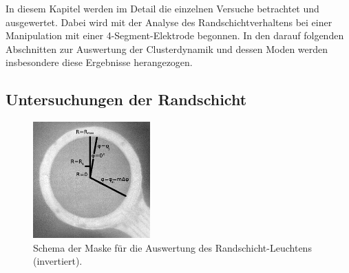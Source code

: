 \documentclass[numbers=noenddot,a4paper]{scrartcl}
\begin{document}
		In diesem Kapitel werden im Detail die einzelnen Versuche betrachtet und ausgewertet. Dabei wird mit der Analyse des Randschichtverhaltens bei einer Manipulation mit einer 4-Segment-Elektrode begonnen. In den darauf folgenden Abschnitten zur Auswertung der Clusterdynamik und dessen Moden werden insbesondere diese Ergebnisse herangezogen.

        \subsection{Untersuchungen der Randschicht}

                \begin{figure}
                    \centering
                    \includegraphics[width=0.4\textwidth,height=0.4\textwidth]{figs/auswertung/randanalysemaske.png}
                    \caption{Schema der Maske für die Auswertung des Randschicht-Leuchtens (invertiert).}
                    \label{img:randmaske}
                \end{figure}
\end{document}
